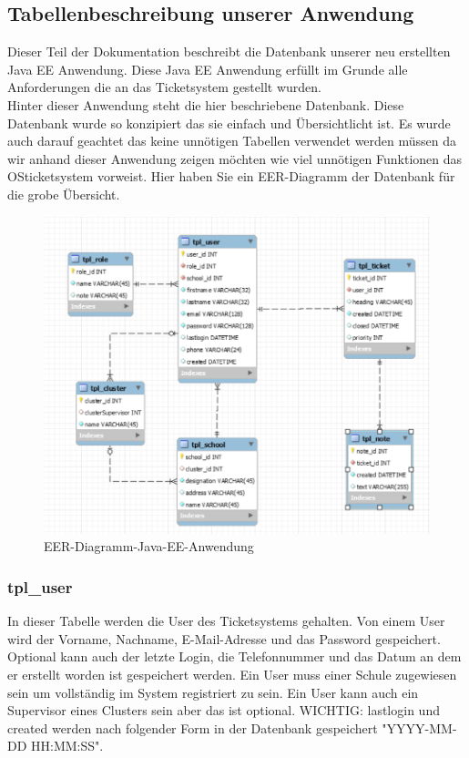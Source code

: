\subsection{Tabellenbeschreibung unserer Anwendung}
Dieser Teil der Dokumentation beschreibt die Datenbank unserer neu erstellten Java EE Anwendung. Diese Java EE Anwendung erfüllt im Grunde alle Anforderungen die an das Ticketsystem gestellt wurden.\\
Hinter dieser Anwendung steht die hier beschriebene Datenbank. Diese Datenbank wurde so konzipiert das sie einfach und Übersichtlicht ist. Es wurde auch darauf geachtet das keine unnötigen Tabellen verwendet werden müssen da wir anhand dieser Anwendung zeigen möchten wie viel unnötigen Funktionen das OSticketsystem vorweist.
Hier haben Sie ein EER-Diagramm der Datenbank für die grobe Übersicht.
\begin{figure}[h]
	\centering
	\includegraphics[scale=.8]{figures/EER-Diagramm-Java-EE-Anwendung.PNG}
	\caption{EER-Diagramm-Java-EE-Anwendung}
	\label{EER-Diagramm-Java-EE-Anwendung}
\end{figure}

\newpage

\subsubsection{tpl\_user}

In dieser Tabelle werden die User des Ticketsystems gehalten. Von einem User wird der Vorname, Nachname, E-Mail-Adresse und das Password gespeichert. Optional kann auch der letzte Login, die Telefonnummer und das Datum an dem er erstellt worden ist gespeichert werden.
Ein User muss einer Schule zugewiesen sein um vollständig im System registriert zu sein. Ein User kann auch ein Supervisor eines Clusters sein aber das ist optional.
WICHTIG: lastlogin und created werden nach folgender Form in der Datenbank gespeichert "YYYY-MM-DD HH:MM:SS".

